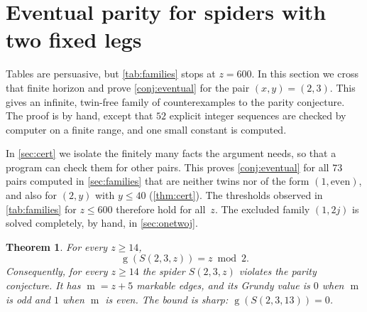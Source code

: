 \documentclass[11pt]{amsart}
\newtheorem{theorem}{Theorem}[section]
\theoremstyle{definition}
\theoremstyle{remark}
\newcommand{\gv}{\operatorname{g}}           %
\newcommand{\m}{\operatorname{m}}
\newcommand{\Sp}{S}
\begin{document}
\section{Eventual parity for spiders with two fixed legs}\label{sec:s23}

Tables are persuasive, but \cref{tab:families} stops at $z=600$. In this section we cross that finite horizon and prove \cref{conj:eventual} for the pair $(x,y)=(2,3)$. This gives an infinite, twin-free family of counterexamples to the parity conjecture. The proof is by hand, except that $52$ explicit integer sequences are checked by computer on a finite range, and one small constant is computed.

In \cref{sec:cert} we isolate the finitely many facts the argument needs, so that a program can check them for other pairs. This proves \cref{conj:eventual} for all $73$ pairs computed in \cref{sec:families} that are neither twins nor of the form $(1,\text{even})$, and also for $(2,y)$ with $y\le 40$ (\cref{thm:cert}). The thresholds observed in \cref{tab:families} for $z\le 600$ therefore hold for all~$z$. The excluded family $(1,2j)$ is solved completely, by hand, in \cref{sec:onetwoj}.

\begin{theorem}\label{thm:s23}
For every $z\ge 14$,
\[
  \gv(\Sp(2,3,z))=z\bmod 2 .
\]
Consequently, for every $z\ge 14$ the spider $\Sp(2,3,z)$ violates the parity conjecture. It has $\m=z+5$ markable edges, and its Grundy value is $0$ when $\m$ is odd and $1$ when $\m$ is even. The bound is sharp: $\gv(\Sp(2,3,13))=0$.
\end{theorem}
\end{document}

